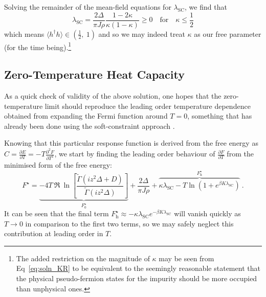 Solving the remainder of the mean-field equations for $ \lambda_{\text{SC}} $, we find that
\begin{equation}
\lambda_{\text{SC}} = \frac{2 \Delta}{\pi J \rho} \frac{1 - 2 \kappa}{\kappa (1 - \kappa)} \geq 0 \quad \text{for} \quad \kappa \leq \frac{1}{2}
\label{eq:soln_lambda_SC} %
\end{equation} which means $ \langle h^{\dagger} h \rangle \in (\frac{1}{2}, ~ 1) $ and so we may indeed treat $ \kappa $ as our free parameter (for the time being).\footnote{The added restriction on the magnitude of $ \kappa $ may be seen from Eq~\eqref{eq:soln_KR} to be equivalent to the seemingly reasonable statement that the physical pseudo-fermion states for the impurity should be more occupied than unphysical ones.}

\subsection{Zero-Temperature Heat Capacity}

As a quick check of validity of the above solution, one hopes that the zero-temperature limit should reproduce the leading order temperature dependence obtained from expanding the Fermi function around $ T = 0 $, something that has already been done using the soft-constraint approach \cite{Draft}.

Knowing that this particular response function is derived from the free energy as $ C = \frac{\partial E}{\partial T} = - T \frac{\partial^{2} F}{\partial T ^2} $, we start by finding the leading order behaviour of $ \frac{\partial F}{\partial T} $ from the minimised form of the free energy:
\begin{equation}
F^{\star} = \underbrace{- 4 T ~ \Re{ ~ \ln{\left[ \frac{\widetilde{\Gamma}(i z^2 \Delta + D)}{\widetilde{\Gamma}(i z^2 \Delta)} \right]}}}_{F_0^{\star}} + \frac{2 \Delta}{\pi J \rho} + \overbrace{\kappa \lambda_{\text{SC}}  - T \ln{\left( 1 + e^{\beta K \lambda_{\text{SC}}} \right)}}^{F_{\text{h}}^{\star}} ~ .
\end{equation}
It can be seen that the final term $ F_{\text{h}}^{\star} \approx - \kappa \lambda_{\text{SC}} e^{- \beta K \lambda_{\text{SC}}} $ will vanish quickly as $ T \rightarrow 0 $ in comparison to the first two terms, so we may safely neglect this contribution at leading order in $ T $.

